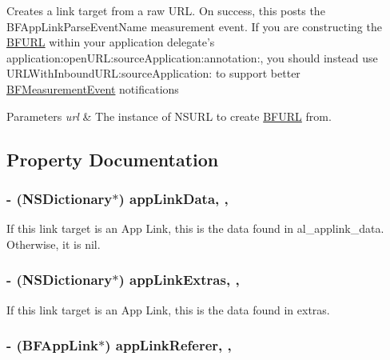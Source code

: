 Creates a link target from a raw U\-R\-L. On success, this posts the B\-F\-App\-Link\-Parse\-Event\-Name measurement event. If you are constructing the \hyperlink{interface_b_f_u_r_l}{B\-F\-U\-R\-L} within your application delegate's application\-:open\-U\-R\-L\-:source\-Application\-:annotation\-:, you should instead use U\-R\-L\-With\-Inbound\-U\-R\-L\-:source\-Application\-: to support better \hyperlink{interface_b_f_measurement_event}{B\-F\-Measurement\-Event} notifications 
\begin{DoxyParams}{Parameters}
{\em url} & The instance of {\ttfamily N\-S\-U\-R\-L} to create \hyperlink{interface_b_f_u_r_l}{B\-F\-U\-R\-L} from. \\
\hline
\end{DoxyParams}


\subsection{Property Documentation}
\hypertarget{interface_b_f_u_r_l_a7f41095ee721d9b4beae17f9fd9aafe5}{
\subsubsection[{app\-Link\-Data}]{\setlength{\rightskip}{0pt plus 5cm}-\/ (N\-S\-Dictionary$\ast$) app\-Link\-Data\hspace{0.3cm}{\ttfamily [read]}, {\ttfamily [nonatomic]}, {\ttfamily [strong]}}}\label{interface_b_f_u_r_l_a7f41095ee721d9b4beae17f9fd9aafe5}
If this link target is an App Link, this is the data found in al\-\_\-applink\-\_\-data. Otherwise, it is nil. \hypertarget{interface_b_f_u_r_l_a47ef1fbe340b610c07b6f80e0c3c16ab}{
\subsubsection[{app\-Link\-Extras}]{\setlength{\rightskip}{0pt plus 5cm}-\/ (N\-S\-Dictionary$\ast$) app\-Link\-Extras\hspace{0.3cm}{\ttfamily [read]}, {\ttfamily [nonatomic]}, {\ttfamily [strong]}}}\label{interface_b_f_u_r_l_a47ef1fbe340b610c07b6f80e0c3c16ab}
If this link target is an App Link, this is the data found in extras. \hypertarget{interface_b_f_u_r_l_a0256b0b7763ce81aa3556c13d2363f57}{
\subsubsection[{app\-Link\-Referer}]{\setlength{\rightskip}{0pt plus 5cm}-\/ ({\bf B\-F\-App\-Link}$\ast$) app\-Link\-Referer\hspace{0.3cm}{\ttfamily [read]}, {\ttfamily [nonatomic]}, {\ttfamily [strong]}}}\label{interface_b_f_u_r_l_a0256b0b7763ce81aa3556c13d2363f57}
